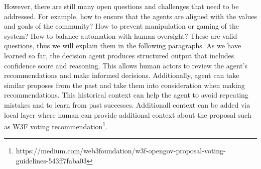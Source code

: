 However, there are still many open questions and challenges that need to be addressed. For example, how to ensure that the agents are aligned with the values and goals of the community? How to prevent manipulation or gaming of the system? How to balance automation with human oversight? These are valid questions, thus we will explain them in the following paragraphs.
As we have learned so far, the decision agent produces structured output that includes confidence score and reasoning. This allows human actors to review the agent's recommendations and make informed decisions. Additionally, agent can take similar proposes from the past and take them into consideration when making recommendations. This historical context can help the agent to avoid repeating mistakes and to learn from past successes. Additionall context can be added via local layer where human can provide additional context about the proposal such as W3F voting recommendation\footnote{https://medium.com/web3foundation/w3f-opengov-proposal-voting-guidelines-543ff7faba03}.







